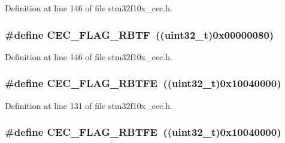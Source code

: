 Definition at line 146 of file stm32f10x\+\_\+cec.\+h.

\subsubsection[{\texorpdfstring{C\+E\+C\+\_\+\+F\+L\+A\+G\+\_\+\+R\+B\+TF}{CEC_FLAG_RBTF}}]{\setlength{\rightskip}{0pt plus 5cm}\#define C\+E\+C\+\_\+\+F\+L\+A\+G\+\_\+\+R\+B\+TF~(({\bf uint32\+\_\+t})0x00000080)}\hypertarget{group___c_e_c__flags__definition_gae73c6ec73ab8ad57b18d3bd416baf2d3}{}\label{group___c_e_c__flags__definition_gae73c6ec73ab8ad57b18d3bd416baf2d3}


Definition at line 146 of file stm32f10x\+\_\+cec.\+h.

\subsubsection[{\texorpdfstring{C\+E\+C\+\_\+\+F\+L\+A\+G\+\_\+\+R\+B\+T\+FE}{CEC_FLAG_RBTFE}}]{\setlength{\rightskip}{0pt plus 5cm}\#define C\+E\+C\+\_\+\+F\+L\+A\+G\+\_\+\+R\+B\+T\+FE~(({\bf uint32\+\_\+t})0x10040000)}\hypertarget{group___c_e_c__flags__definition_gafdfca815014dee4a458083337795c336}{}\label{group___c_e_c__flags__definition_gafdfca815014dee4a458083337795c336}


Definition at line 131 of file stm32f10x\+\_\+cec.\+h.

\subsubsection[{\texorpdfstring{C\+E\+C\+\_\+\+F\+L\+A\+G\+\_\+\+R\+B\+T\+FE}{CEC_FLAG_RBTFE}}]{\setlength{\rightskip}{0pt plus 5cm}\#define C\+E\+C\+\_\+\+F\+L\+A\+G\+\_\+\+R\+B\+T\+FE~(({\bf uint32\+\_\+t})0x10040000)}\hypertarget{group___c_e_c__flags__definition_gafdfca815014dee4a458083337795c336}{}\label{group___c_e_c__flags__definition_gafdfca815014dee4a458083337795c336}


